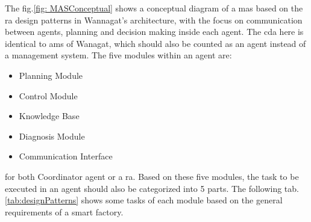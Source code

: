The fig.\ref{fig: MASConceptual} shows a conceptual diagram of a \gls{mas} based on the \gls{ra} design patterns in Wannagat’s architecture, with the focus on communication between agents, planning and decision making inside each agent. The \gls{cda} here is identical to \gls{ams} of Wanagat, which should also be counted as an agent instead of a management system. The five modules within an agent are: 
\begin{itemize}
    \item Planning Module
    \item Control Module
    \item Knowledge Base
    \item Diagnosis Module
    \item Communication Interface
\end{itemize}

for both Coordinator agent or a \gls{ra}.
Based on these five modules, the task to be executed in an agent should also be categorized into 5 parts. The following tab.\ref{tab:designPatterns} shows some tasks of each module based on the general requirements of a smart factory.



